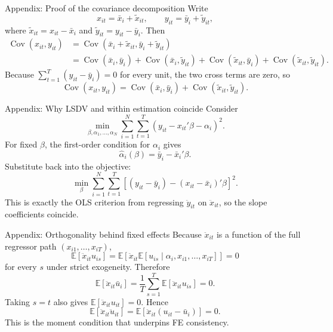\documentclass[10pt]{beamer}
\DeclareMathOperator{\Cov}{Cov}
\newcommand{\E}{\mathbb{E}}
\begin{document}
\begin{frame}{Appendix: Proof of the covariance decomposition}
\label{app:covproof}
\small
Write
\[
x_{it} = \bar{x}_i + \tilde{x}_{it},
\qquad
y_{it} = \bar{y}_i + \tilde{y}_{it},
\]
where $\tilde{x}_{it}=x_{it}-\bar{x}_i$ and $\tilde{y}_{it}=y_{it}-\bar{y}_i$. Then
\begin{align*}
\Cov(x_{it}, y_{it})
&= \Cov(\bar{x}_i+\tilde{x}_{it}, \bar{y}_i+\tilde{y}_{it}) \\
&= \Cov(\bar{x}_i,\bar{y}_i)
+ \Cov(\bar{x}_i,\tilde{y}_{it})
+ \Cov(\tilde{x}_{it},\bar{y}_i)
+ \Cov(\tilde{x}_{it},\tilde{y}_{it}).
\end{align*}
Because $\sum_{t=1}^T (y_{it}-\bar{y}_i)=0$ for every unit, the two cross terms are zero, so
\[
\Cov(x_{it}, y_{it})
=
\Cov(\bar{x}_i,\bar{y}_i) + \Cov(\tilde{x}_{it},\tilde{y}_{it}).
\]
\hfill\hyperlink{slide:covdecomp}{}
\end{frame}

\begin{frame}{Appendix: Why LSDV and within estimation coincide}
\label{app:lsdvproof}
\small
Consider
\[
\min_{\beta,\alpha_1,\ldots,\alpha_N}
\sum_{i=1}^N \sum_{t=1}^T
\left(y_{it}-x_{it}'\beta-\alpha_i\right)^2.
\]
For fixed $\beta$, the first-order condition for $\alpha_i$ gives
\[
\hat{\alpha}_i(\beta) = \bar{y}_i - \bar{x}_i'\beta.
\]
Substitute back into the objective:
\[
\min_{\beta}
\sum_{i=1}^N \sum_{t=1}^T
\left[(y_{it}-\bar{y}_i) - (x_{it}-\bar{x}_i)'\beta\right]^2.
\]
This is exactly the OLS criterion from regressing $\ddot{y}_{it}$ on $\ddot{x}_{it}$, so the slope coefficients coincide.
\hfill\hyperlink{slide:fekeep}{}
\end{frame}

\begin{frame}{Appendix: Orthogonality behind fixed effects}
\label{app:feorthproof}
\small
Because $\ddot{x}_{it}$ is a function of the full regressor path $(x_{i1},\ldots,x_{iT})$,
\[
\E[\ddot{x}_{it}u_{is}]
=
\E\!\left[\ddot{x}_{it}\E[u_{is}\mid \alpha_i,x_{i1},\ldots,x_{iT}]\right] = 0
\]
for every $s$ under strict exogeneity. Therefore
\[
\E[\ddot{x}_{it}\bar{u}_i]
= \frac{1}{T}\sum_{s=1}^T \E[\ddot{x}_{it}u_{is}] = 0.
\]
Taking $s=t$ also gives $\E[\ddot{x}_{it}u_{it}] = 0$. Hence
\[
\E[\ddot{x}_{it}\ddot{u}_{it}]
=
\E[\ddot{x}_{it}(u_{it}-\bar{u}_i)]
= 0.
\]
This is the moment condition that underpins FE consistency.
\hfill\hyperlink{slide:feorth}{}
\end{frame}
\end{document}
